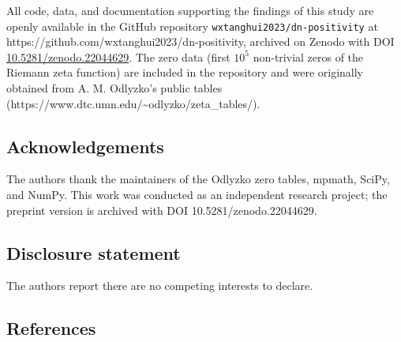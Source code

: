 \documentclass[
]{article}
\begin{document}
All code, data, and documentation supporting the findings of this study
are openly available in the GitHub repository
\texttt{wxtanghui2023/dn-positivity} at
https://github.com/wxtanghui2023/dn-positivity, archived on Zenodo with
DOI
\href{https://doi.org/10.5281/zenodo.22044629}{10.5281/zenodo.22044629}.
The zero data (first \(10^5\) non-trivial zeros of the Riemann zeta
function) are included in the repository and were originally obtained
from A. M. Odlyzko's public tables
(https://www.dtc.umn.edu/\textasciitilde odlyzko/zeta\_tables/).

\hypertarget{acknowledgements}{%
\subsection{Acknowledgements}\label{acknowledgements}}

The authors thank the maintainers of the Odlyzko zero tables, mpmath,
SciPy, and NumPy. This work was conducted as an independent research
project; the preprint version is archived with DOI
10.5281/zenodo.22044629.

\hypertarget{disclosure-statement}{%
\subsection{Disclosure statement}\label{disclosure-statement}}

The authors report there are no competing interests to declare.

\hypertarget{references}{%
\subsection{References}\label{references}}
\end{document}
